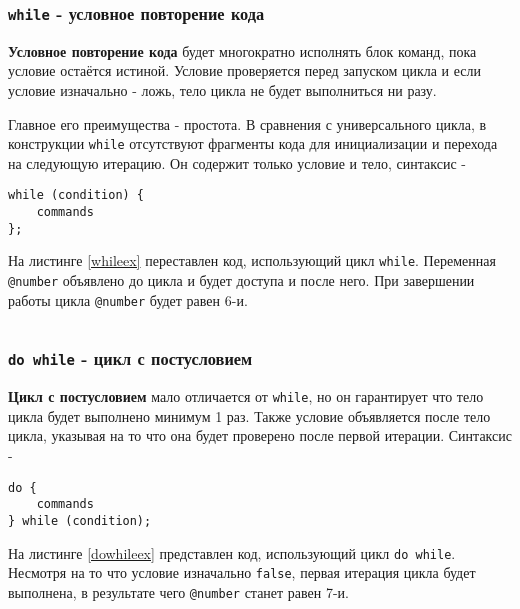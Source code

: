 \begin{sourcecode}
	\label{uniloopex}
    \inputminted[linenos]{icl}{../sources/uniloopex.icL}
\end{sourcecode}

\subsubsection{\texttt{while} - условное повторение кода}

{\bf Условное повторение кода} будет многократно исполнять блок команд, пока условие остаётся истиной. Условие проверяется перед запуском цикла и если условие изначально - ложь, тело цикла не будет выполниться ни разу.

Главное его преимущества - простота. В сравнения с универсального цикла, в конструкции \texttt{while} отсутствуют фрагменты кода для инициализации и перехода на следующую итерацию. Он содержит только условие и тело, синтаксис -
\begin{verbatim}
while (condition) {
	commands
};
\end{verbatim}

На листинге \ref{whileex} переставлен код, использующий цикл \texttt{while}. Переменная \texttt{@number} объявлено до цикла и будет доступа и после него. При завершении работы цикла \texttt{@number} будет равен 6-и.

\begin{sourcecode}
	\label{whileex}
    \inputminted[linenos]{icl}{../sources/whileex.icL}
\end{sourcecode}

\subsubsection{\texttt{do while} - цикл с постусловием}

{\bf Цикл с постусловием} мало отличается от \texttt{while}, но он гарантирует что тело цикла будет выполнено минимум 1 раз. Также условие объявляется после тело цикла, указывая на то что она будет проверено после первой итерации. Синтаксис -
\begin{verbatim}
do {
	commands
} while (condition);
\end{verbatim}

На листинге \ref{dowhileex} представлен код, использующий цикл \texttt{do while}. Несмотря на то что условие изначально \texttt{false}, первая итерация цикла будет выполнена, в результате чего \texttt{@number} станет равен 7-и.

